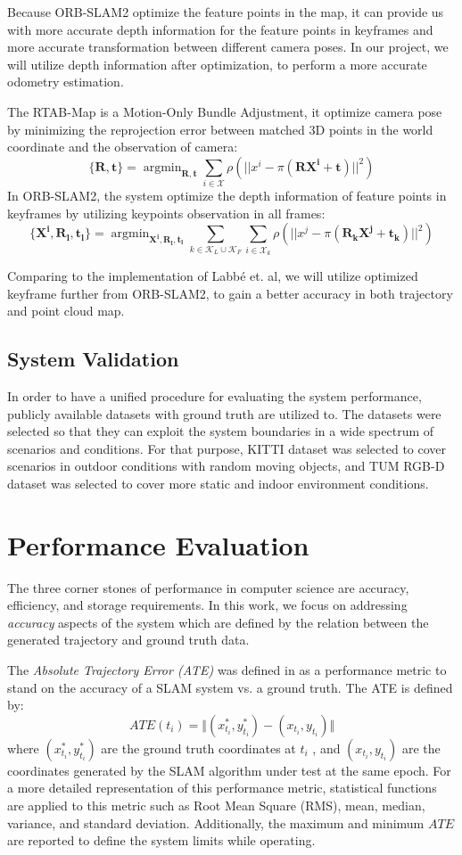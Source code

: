 \documentclass[12pt]{article}
\DeclareMathOperator*{\argmin}{argmin}
\begin{document}
Because ORB-SLAM2 optimize the feature points in the map, it can provide us with more accurate depth information for the feature points\cite{mur2017orb} in keyframes and more accurate transformation between different camera poses. In our project, we will utilize depth information after optimization, to perform a more accurate odometry estimation.

The RTAB-Map is a Motion-Only Bundle Adjustment, it optimize camera pose by minimizing the reprojection error between matched 3D points in the world coordinate and the observation of camera:
$$
\{\mathbf{R,t}\}= \argmin_{\mathbf{R,t}}\sum_{i\in\mathcal{X}}\rho(||x^i-\pi(\mathbf{RX^i+t})||^2) 
$$ 
In ORB-SLAM2, the system optimize the depth information of feature points in keyframes by utilizing keypoints observation in all frames\cite{mur2017orb}:
$$
\{\mathbf{X^i,R_l,t_l}\}= \argmin_{\mathbf{X^i,R_l,t_l}}\sum_{k\in\mathcal{K}_L\cup\mathcal{K}_F} \sum_{i\in\mathcal{X}_k}\rho(||x^j-\pi(\mathbf{R_kX^j+t_k})||^2) 
$$ 

Comparing to the implementation of Labb{\'e} et. al\cite{labbe2019rtab}, we will utilize optimized keyframe further from ORB-SLAM2, to gain a better accuracy in both trajectory and point cloud map. 

\subsection{System Validation}
In order to have a unified procedure for evaluating the system performance, publicly available datasets with ground truth are utilized to. The datasets were selected so that they can exploit the system boundaries in a wide spectrum of scenarios and conditions. For that purpose, KITTI dataset \cite{Geiger2012CVPR} was selected to cover scenarios in outdoor conditions with random moving objects, and TUM RGB-D dataset \cite{sturm2012benchmark} was selected to cover more static and indoor environment conditions.

\section{Performance Evaluation}
The three corner stones of performance in computer science are accuracy, efficiency, and storage requirements. In this work, we focus on addressing \textit{accuracy} aspects of the system which are defined by the relation between the generated trajectory and ground truth data. 

The \textit{Absolute Trajectory Error (ATE)} was defined in \cite{8710464} as a performance metric to stand on the accuracy of a SLAM system vs. a ground truth. The ATE is defined by:
\begin{equation}
ATE(t_i) = \Vert (x_{t_i}^*,y_{t_i}^*) - (x_{t_i},y_{t_i}) \Vert
\end{equation}
where $(x_{t_i}^*,y_{t_i}^*)$ are the ground truth coordinates at $t_i$ , and $(x_{t_i},y_{t_i})$ are the coordinates generated by the SLAM algorithm under test at the same epoch. For a more detailed representation of this performance metric, statistical functions are applied to this metric such as Root Mean Square (RMS), mean, median, variance, and standard deviation. Additionally, the maximum and minimum $ATE$ are reported to define the system limits while operating. 
\end{document}
